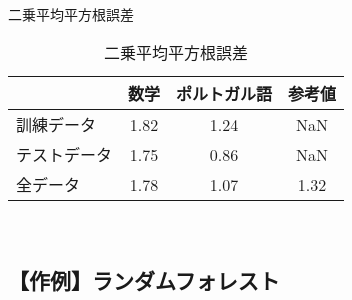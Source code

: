 \documentclass[9pt]{ltjsarticle}
\begin{document}
\newpage
    \begin{center}
    \end{center}
    { \hspace*{\fill} \\}
    
    \begin{center}
    \end{center}
    
    \begin{center}
    \end{center}
    
         \begin{table}[h]
\caption{二乗平均平方根誤差}
\begin{center}
二乗平均平方根誤差\\
\begin{tabular}{l|ccc}
     &    数学 & ポルトガル語 &  参考値 \cite{cortez} \\
      \hline \hline
訓練データ  & 1.82   & 1.24  & NaN \\
テストデータ & 1.75 &   0.86  & NaN \\
全データ   & 1.78 &   1.07  &1.32
\end{tabular}
\end{center}
\label{default}
\end{table}%

            \begin{center}
    \end{center}
    { \hspace*{\fill} \\}

\newpage
        
    \hypertarget{ux4f5cux4f8bux30e9ux30f3ux30c0ux30e0ux30d5ux30a9ux30ecux30b9ux30c8}{%
\subsection{【作例】ランダムフォレスト}\label{ux4f5cux4f8bux30e9ux30f3ux30c0ux30e0ux30d5ux30a9ux30ecux30b9ux30c8}}
\end{document}
